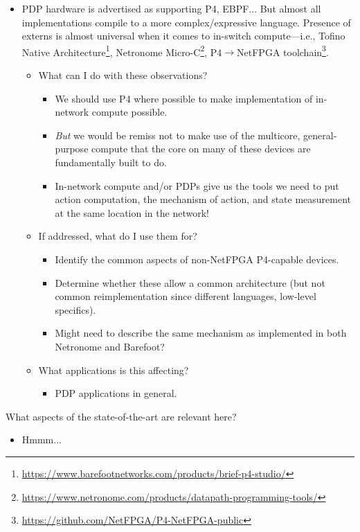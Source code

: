 \documentclass[sigconf,natbib=false]{acmart}
\begin{document}
\begin{itemize}
	\item PDP hardware is advertised as supporting P4, EBPF... But almost all implementations compile to a more complex/expressive language. Presence of externs is almost universal when it comes to in-switch compute---i.e., Tofino Native Architecture\footnote{\url{    https://www.barefootnetworks.com/products/brief-p4-studio/}}, Netronome Micro-C\footnote{\url{https://www.netronome.com/products/datapath-programming-tools/}}, P4$\rightarrow$NetFPGA toolchain\footnote{\url{https://github.com/NetFPGA/P4-NetFPGA-public}}.
	\begin{itemize}
		\item What can I do with these observations?
		\begin{itemize}
			\item We should use P4 where possible to make implementation of in-network compute possible.
			\item \emph{But} we would be remiss not to make use of the multicore, general-purpose compute that the core on many of these devices are fundamentally built to do.
			\item In-network compute and/or PDPs give us the tools we need to put action computation, the mechanism of action, and state measurement at the same location in the network!
		\end{itemize}
		\item If addressed, what do I use them for?
		\begin{itemize}
			\item Identify the common aspects of non-NetFPGA P4-capable devices.
			\item Determine whether these allow a common architecture (but not common reimplementation since different languages, low-level specifics).
			\item Might need to describe the same mechanism as implemented in both Netronome and Barefoot?
		\end{itemize}
		\item What applications is this affecting?
		\begin{itemize}
			\item PDP applications in general.
		\end{itemize}
	\end{itemize}
\end{itemize}

What aspects of the state-of-the-art are relevant here?

\begin{itemize}
	\item Hmmm...
\end{itemize}
\end{document}
